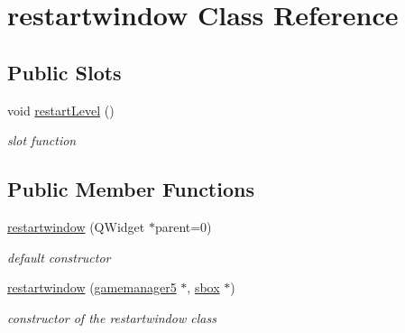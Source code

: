 \hypertarget{classrestartwindow}{\section{restartwindow \-Class \-Reference}
\label{classrestartwindow}
}
\subsection*{\-Public \-Slots}
\begin{DoxyCompactItemize}
\item 
void \hyperlink{classrestartwindow_a52f7c83fd104bf9f64959f113d0cba33}{restart\-Level} ()
\begin{DoxyCompactList}\small\item\em slot function \end{DoxyCompactList}\end{DoxyCompactItemize}
\subsection*{\-Public \-Member \-Functions}
\begin{DoxyCompactItemize}
\item 
\hypertarget{classrestartwindow_a8e2382e52f34a9059049e15d0ec4aa36}{\hyperlink{classrestartwindow_a8e2382e52f34a9059049e15d0ec4aa36}{restartwindow} (\-Q\-Widget $\ast$parent=0)}\label{classrestartwindow_a8e2382e52f34a9059049e15d0ec4aa36}

\begin{DoxyCompactList}\small\item\em default constructor \end{DoxyCompactList}\item 
\hyperlink{classrestartwindow_a77129b996362cdb4aa2bd55e7c22c878}{restartwindow} (\hyperlink{classgamemanager5}{gamemanager5} $\ast$, \hyperlink{classsbox}{sbox} $\ast$)
\begin{DoxyCompactList}\small\item\em constructor of the restartwindow class \end{DoxyCompactList}\end{DoxyCompactItemize}
